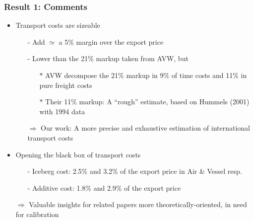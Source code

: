 \documentclass[10 pt,Helvetica, french]{beamer}
\begin{document}
 \begin{frame}
\frametitle{Result 1: Comments}
\begin{itemize}
\item Transport costs are sizeable \vspace{0.1cm}
\begin{itemize}
\item[-] Add $\simeq$ a 5\% margin over the export price \vspace{0.1cm}
\item[-] Lower than the 21\% markup taken from AVW, but  \vspace{0.1cm}
\begin{itemize}
\item[$\ast$] AVW decompose the 21\% markup in 9\% of time costs and 11\% in pure freight costs  \vspace{0.1cm}
\item[$\ast$] Their 11\% markup: A ``rough'' estimate, based on Hummels (2001) with 1994 data \vspace{0.1cm}
\end{itemize}
\item[$\Rightarrow$] Our work: A more precise and exhaustive estimation of international transport costs \vspace{0.1cm}
\end{itemize}
\item Opening the black box of transport costs \vspace{0.1cm}
\begin{itemize}
\item[-] Iceberg cost: 2.5\% and 3.2\% of the export price in Air \& Vessel resp.
\item[-] Additive cost: 1.8\% and 2.9\% of the export price \vspace{0.1cm}
\end{itemize}
\item[$\Rightarrow$] Valuable insights for related papers more theoretically-oriented, in need for calibration
\end{itemize}
\end{frame}
\end{document}
